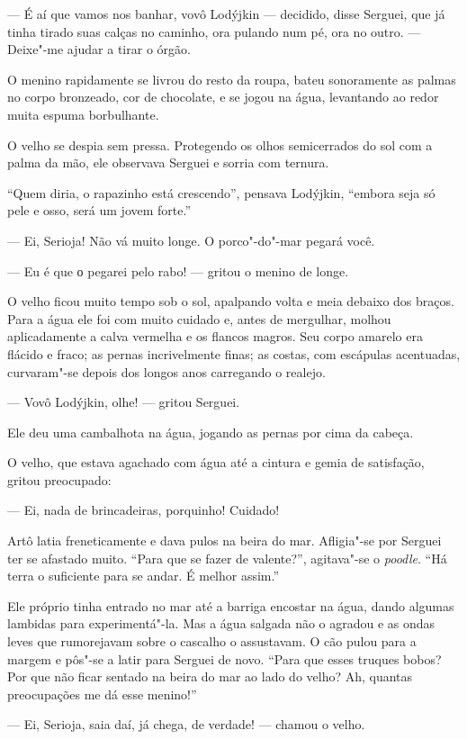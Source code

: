 --- É aí que vamos nos banhar, vovô Lodýjkin --- decidido, disse
Serguei, que já tinha tirado suas calças no caminho, ora pulando num pé,
ora no outro. --- Deixe"-me ajudar a tirar o órgão.

O menino rapidamente se livrou do resto da roupa, bateu sonoramente as
palmas no corpo bronzeado, cor de chocolate, e se jogou na água,
levantando ao redor muita espuma borbulhante.

O velho se despia sem pressa. Protegendo os olhos semicerrados do sol
com a palma da mão, ele observava Serguei e sorria com ternura.

``Quem diria, o rapazinho está crescendo'', pensava Lodýjkin, ``embora
seja só pele e osso, será um jovem forte.''

--- Ei, Serioja! Não vá muito longe. O porco"-do"-mar pegará você.

--- Eu é que о pegarei pelo rabo! --- gritou o menino de longe.

O velho ficou muito tempo sob o sol, apalpando volta e meia debaixo dos
braços. Para a água ele foi com muito cuidado e, antes de mergulhar,
molhou aplicadamente a calva vermelha e os flancos magros. Seu corpo
amarelo era flácido e fraco; as pernas incrivelmente finas; as costas,
com escápulas acentuadas, curvaram"-se depois dos longos anos carregando
o realejo.

--- Vovô Lodýjkin, olhe! --- gritou Serguei.

Ele deu uma cambalhota na água, jogando as pernas por cima da cabeça.

O velho, que estava agachado com água até a cintura e gemia de
satisfação, gritou preocupado:

--- Ei, nada de brincadeiras, porquinho! Cuidado!

Artô latia freneticamente e dava pulos na beira do mar. Afligia"-se por
Serguei ter se afastado muito. ``Para que se fazer de valente?'',
agitava"-se o \emph{poodle}. ``Há terra o suficiente para se andar. É
melhor assim.''

Ele próprio tinha entrado no mar até a barriga encostar na água, dando
algumas lambidas para experimentá"-la. Mas a água salgada não o agradou e
as ondas leves que rumorejavam sobre o cascalho o assustavam. O cão
pulou para a margem e pôs"-se a latir para Serguei de novo. ``Para que
esses truques bobos? Por que não ficar sentado na beira do mar ao lado
do velho? Ah, quantas preocupações me dá esse menino!''

--- Ei, Serioja, saia daí, já chega, de verdade! --- chamou o velho.

